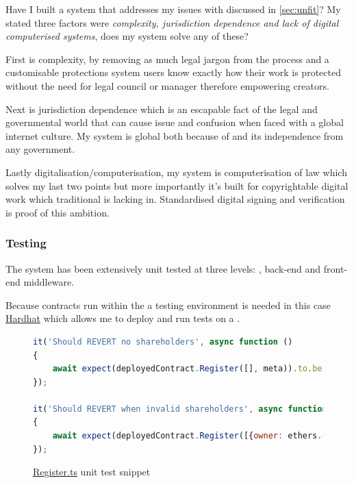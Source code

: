 Have I built a system that addresses my issues with  discussed in \autoref{sec:unfit}? My stated three factors were \textit{complexity, jurisdiction dependence and lack of digital computerised systems}, does my system solve any of these?

First is complexity, by removing as much legal jargon from the process and a customisable protections system users know exactly how their work is protected without the need for legal council or manager therefore empowering creators. 

Next is jurisdiction dependence which is an escapable fact of the legal and governmental world that can cause issue and confusion when faced with a global internet culture. My system is global both because of  and its independence from any government.

Lastly digitalisation/computerisation, my system is computerisation of  law which solves my last two points but more importantly it's built for copyrightable digital work which traditional  is lacking in. Standardised digital signing and verification is proof of this ambition.

\subsubsection{Testing}

The system has been extensively unit tested at three levels: , back-end and front-end middleware.

Because contracts run within the  a testing environment is needed in this case \href{https://hardhat.org/}{Hardhat} which allows me to deploy and run tests on a .

\begin{figure}[H]
\caption{\href{https://github.com/MrHarrisonBarker/CRPL/blob/main/CRPL.Contracts/test/Copyright/Register.ts}{Register.ts} unit test snippet}
\centering
\begin{lstlisting}[language=JavaScript]
it('Should REVERT no shareholders', async function ()
{
	await expect(deployedContract.Register([], meta)).to.be.revertedWith('NO_SHAREHOLDERS');
});

it('Should REVERT when invalid shareholders', async function ()
{
	await expect(deployedContract.Register([{owner: ethers.constants.AddressZero, share: 1}], meta)).to.be.revertedWith('INVALID_ADDR');
});
\end{lstlisting}
\end{figure}

